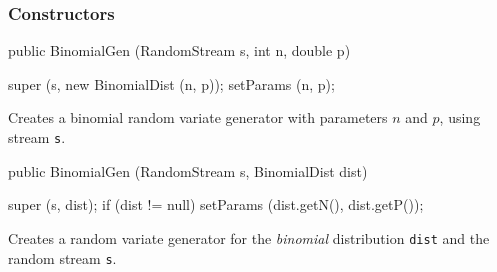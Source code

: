 \subsubsection* {Constructors}
\begin{code}

   public BinomialGen (RandomStream s, int n, double p)\begin{hide} {
      super (s, new BinomialDist (n, p));
      setParams (n, p);
   }\end{hide}
\end{code}
  \begin{tabb}
  Creates a binomial random variate generator with parameters $n$ and $p$,
  using stream \texttt{s}.
 \end{tabb}
\begin{code}

   public BinomialGen (RandomStream s, BinomialDist dist) \begin{hide} {
      super (s, dist);
      if (dist != null)
         setParams (dist.getN(), dist.getP());
   }\end{hide}
\end{code}
  \begin{tabb} Creates a random variate generator for the {\em binomial\/} 
    distribution \texttt{dist} and the random stream \texttt{s}. 
 \end{tabb}

